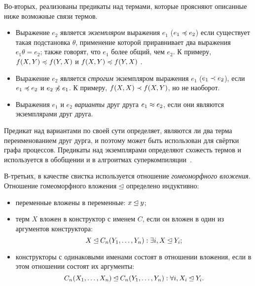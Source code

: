 
Во-вторых, реализованы предикаты над термами, которые проясняют описанные ниже возможные связи термов.
\begin{itemize}
\item Выражение $e_2$ является \emph{экземпляром} выражения $e_1$ ($e_1 \preccurlyeq e_2$)
если существует такая подстановка $\theta$, применение которой приравнивает
два выражения $e_1 \theta = e_2$; также говорят, что $e_1$ более общий, чем $e_2$.
К примеру, $f(X, Y) \preccurlyeq f(Y, X)$ и $f(X, Y) \preccurlyeq f(Y, X)$ .
\item Выражение $e_2$ является \emph{строгим} экземпляром выражения $e_1$ ($e_1 \prec e_2$), если
$e_1 \preccurlyeq e_2$ и $e_2 \not\preccurlyeq e_1$. К примеру, $f(X, X) \prec f(X, Y)$, но не наоборот.
\item Выражения $e_1$ и $e_2$ \emph{варианты} друг друга $e_1\approx e_2$, если они являются экземплярами друг друга.
\end{itemize}

Предикат над вариантами по своей сути определяет, являются ли два терма переименованием друг дурга,
и поэтому может быть использован для свёртки графа процессов. Предикаты над экземплярами определяют
схожесть термов и используется в обобщении и в алгроитмах суперкомпиляции~\cite{scPos}.


В-третьих, в качестве свистка используется отношение \emph{гомеоморфного вложения}\cite{scGen}.
Отношение гомеоморфного вложения $\unlhd$ определено индуктивно:
\begin{itemize}
\item переменные вложены в переменные: $x \unlhd y$;
\item терм $X$ вложен в конструктор с именем $C$, если он вложен в один из аргументов конструктора:
      $$X \unlhd C_n(Y_1, \dots, Y_n): \exists i, X \unlhd Y_i;$$
\item конструкторы с одинаковыми именами состоят в отношении вложения, если в этом отношении
      состоят их аргументы:
      $$C_n(X_1, \dots, X_n) \unlhd C_n(Y_1, \dots, Y_n): \forall i, X_i \unlhd Y_i.$$
\end{itemize}

